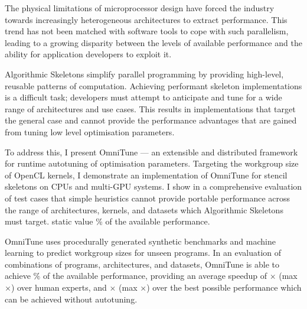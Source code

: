 The physical limitations of microprocessor design have forced the
industry towards increasingly heterogeneous architectures to extract
performance. This trend has not been matched with software tools to
cope with such parallelism, leading to a growing disparity between the
levels of available performance and the ability for application
developers to exploit it.

Algorithmic Skeletons simplify parallel programming by providing
high-level, reusable patterns of computation. Achieving performant
skeleton implementations is a difficult task; developers must attempt
to anticipate and tune for a wide range of architectures and use
cases. This results in implementations that target the general case
and cannot provide the performance advantages that are gained from
tuning low level optimisation parameters.

To address this, I present OmniTune --- an extensible and distributed
framework for runtime autotuning of optimisation parameters. Targeting
the workgroup size of OpenCL kernels, I demonstrate an implementation
of OmniTune for stencil skeletons on CPUs and multi-GPU systems. I
show in a comprehensive evaluation of 
test cases that simple heuristics cannot provide portable performance
across the range of architectures, kernels, and datasets which
Algorithmic Skeletons must target. static value
\% of the available performance.

OmniTune uses procedurally generated synthetic benchmarks and machine
learning to predict workgroup sizes for unseen programs. In an
evaluation of  combinations of programs,
architectures, and datasets, OmniTune is able to achieve
$\%$ of the available
performance, providing an average speedup of
$\times$ (max
$\times$) over human
experts, and $\times$ (max
$\times$) over the best
possible performance which can be achieved without autotuning.


